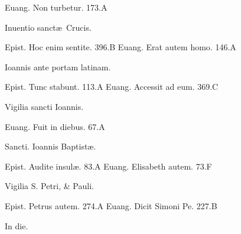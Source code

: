 \documentclass[a5paper,10pt]{book}
\def\ae{æ}
\begin{document}
\begin{multicols}{2}
\newline Euang. Non turbetur. \hfill 173.A
\newline \vspace{-1.75em}
\begin{center}
\color{red} Inuentio sanct\ae \ Crucis.
\end{center}
\vspace{-.75em}
\par \noindent Epist. Hoc enim sentite. \hfill 396.B
\newline Euang. Erat autem homo. \hfill 146.A
\newline \vspace{-1.75em}
\begin{center}
\color{red} Ioannis ante portam latinam.
\end{center}
\vspace{-.75em}
\par \noindent Epist. Tunc stabunt. \hfill 113.A
\newline Euang. Accessit ad eum. \hfill 369.C
\newline \vspace{-1.75em}
\begin{center}
\color{red} Vigilia sancti Ioannis.
\end{center}
\vspace{-.75em}
\par \noindent Euang. Fuit in diebus. \hfill 67.A
\newline \vspace{-1.75em}
\begin{center}
\color{red} Sancti. Ioannis Baptist\ae .
\end{center}
\vspace{-.75em}
\par \noindent Epist. Audite insul\ae . \hfill 83.A
\newline Euang. Elisabeth autem. \hfill 73.F
\newline \vspace{-1.75em}
\begin{center}
\color{red} Vigilia S. Petri, \& Pauli.
\end{center}
\vspace{-.75em}
\par \noindent Epist. Petrus autem. \hfill 274.A
\newline Euang. Dicit Simoni Pe. \hfill 227.B
\newline \vspace{-1.75em}
\begin{center}
\color{red} In die.

\end{center}
\end{multicols}
\end{document}
